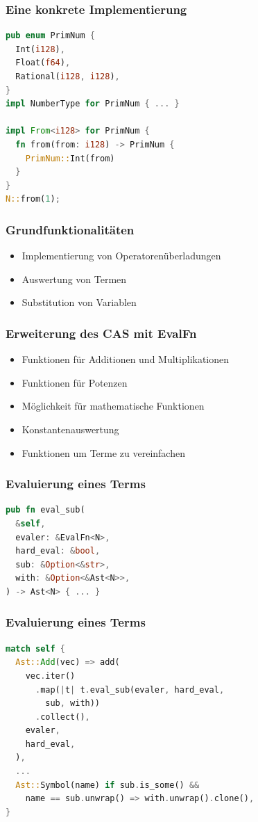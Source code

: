 \documentclass{beamer}
\begin{document}
\begin{frame}[fragile]
  \frametitle{Eine konkrete Implementierung}
  \begin{lstlisting}[language=rust]
pub enum PrimNum {
  Int(i128),
  Float(f64),
  Rational(i128, i128),
}
impl NumberType for PrimNum { ... }

impl From<i128> for PrimNum {
  fn from(from: i128) -> PrimNum {
    PrimNum::Int(from)
  }
}
N::from(1);\end{lstlisting}
\end{frame}

\begin{frame}[fragile]
  \frametitle{Grundfunktionalitäten}
  \begin{itemize}
    \item Implementierung von Operatorenüberladungen
    \pause
    \item Auswertung von Termen
    \pause
    \item Substitution von Variablen
  \end{itemize}
\end{frame}

\begin{frame}[fragile]
  \frametitle{Erweiterung des CAS mit EvalFn}
  \begin{itemize}
    \item Funktionen für Additionen und Multiplikationen
    \pause
    \item Funktionen für Potenzen
    \pause
    \item Möglichkeit für mathematische Funktionen
    \pause
    \item Konstantenauswertung
    \pause
    \item Funktionen um Terme zu vereinfachen
  \end{itemize}
\end{frame}

\begin{frame}[fragile]
  \frametitle{Evaluierung eines Terms}
  \begin{lstlisting}[language=rust]
pub fn eval_sub(
  &self,
  evaler: &EvalFn<N>,
  hard_eval: &bool,
  sub: &Option<&str>,
  with: &Option<&Ast<N>>,
) -> Ast<N> { ... }\end{lstlisting}
\end{frame}

\begin{frame}[fragile]
  \frametitle{Evaluierung eines Terms}
  \begin{lstlisting}[language=rust]
match self {
  Ast::Add(vec) => add(
    vec.iter()
      .map(|t| t.eval_sub(evaler, hard_eval,
        sub, with))
      .collect(),
    evaler,
    hard_eval,
  ),
  ...
  Ast::Symbol(name) if sub.is_some() && 
    name == sub.unwrap() => with.unwrap().clone(),
}\end{lstlisting}
\end{frame}
\end{document}

